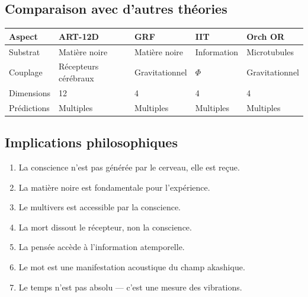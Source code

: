 \subsection{Comparaison avec d'autres théories}
\begin{table}[H]
\centering
\begin{tabular}{@{}lllll@{}}
\toprule
\textbf{Aspect} & \textbf{ART-12D} & \textbf{GRF} & \textbf{IIT} & \textbf{Orch OR} \\ \midrule
Substrat & Matière noire & Matière noire & Information & Microtubules \\
Couplage & Récepteurs cérébraux & Gravitationnel & $\Phi$ & Gravitationnel \\
Dimensions & 12 & 4 & 4 & 4 \\
Prédictions & Multiples & Multiples & Multiples & Multiples \\ \bottomrule
\end{tabular}
\end{table}

\subsection{Implications philosophiques}
\begin{enumerate}
    \item La conscience n'est pas générée par le cerveau, elle est reçue.
    \item La matière noire est fondamentale pour l'expérience.
    \item Le multivers est accessible par la conscience.
    \item La mort dissout le récepteur, non la conscience.
    \item La pensée accède à l'information atemporelle.
    \item Le mot est une manifestation acoustique du champ akashique.
    \item Le temps n'est pas absolu --- c'est une mesure des vibrations.
\end{enumerate}

